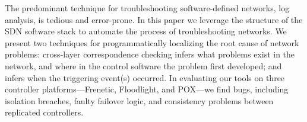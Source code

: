 The predominant technique for troubleshooting software-defined networks,
log analysis, is tedious and error-prone. In this paper we leverage the
structure of the SDN software stack to automate the process of troubleshooting
networks. We present two techniques for programmatically localizing the root cause of network problems:
cross-layer correspondence checking infers what problems exist in the network, 
and where in the control software the problem first developed; and
\simulator{} infers when the triggering event(s) occurred. In evaluating
our tools on
three controller platforms---Frenetic, Floodlight, and POX---we find  bugs,
including isolation breaches,
faulty failover logic, and consistency problems between replicated
controllers.

